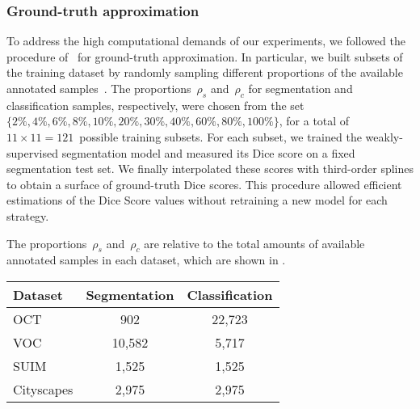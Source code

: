 \subsubsection{Ground-truth approximation}
To address the high computational demands of our experiments, we followed the procedure of~ for ground-truth approximation. 
In particular, we built subsets of the training dataset by randomly sampling different proportions of the available annotated samples~. The proportions~$\rho_s$ and~$\rho_c$ for segmentation and classification samples, respectively, were chosen from the set~$\{2\%, 4\%, 6\%, 8\%, 10\%, 20\%, 30\%, 40\%, 60\%,\allowbreak 80\%, 100\%\}$, for a total of $11\times{}11=121$~possible training subsets. For each subset, we trained the weakly-supervised segmentation model and measured its Dice score on a fixed segmentation test set. We finally interpolated these scores with third-order splines to obtain a surface of ground-truth Dice scores. This procedure allowed efficient estimations of the Dice Score values without retraining a new model for each strategy.

The proportions~$\rho_s$ and~$\rho_c$ are relative to the total amounts of available annotated samples in each dataset, which are shown in .

\begin{table}[h]
\centering
{}
\begin{tabular}{lcc}
\hline
\textbf{Dataset} & \textbf{Segmentation} & \textbf{Classification} \\ \hline
OCT & 902 & 22,723 \\
VOC & 10,582 & 5,717 \\
SUIM & 1,525 & 1,525 \\
Cityscapes & 2,975 & 2,975 \\ \hline
\end{tabular}

\end{table}
